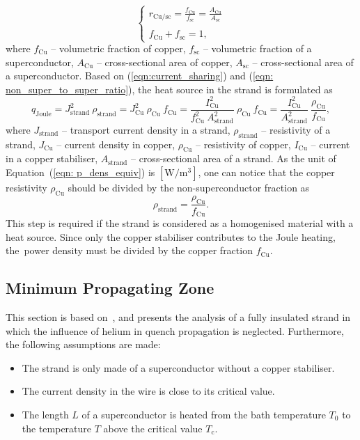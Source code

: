 \begin{equation}
    \left\{ \begin{array}{ll}
    r_\text{Cu/sc} = \frac{f_\text{Cu}}{f_\text{sc}} = \frac{A_\text{Cu}}{A_\text{sc}}\\ \\
    f_\text{Cu} + f_\text{sc} = 1,
    \end{array} \right.
    \label{eqn: non_super_to_super_ratio}
\end{equation}
where $f_\text{Cu}$ -- volumetric fraction of copper, $f_\text{sc}$ -- volumetric fraction of a superconductor, $A_\text{Cu}$ -- cross-sectional area of copper, $A_\text{sc}$ -- cross-sectional area of a superconductor. Based on (\ref{eqn:current_sharing}) and (\ref{eqn: non_super_to_super_ratio}), the heat source in the strand is formulated as 
\begin{equation}
    q_\text{Joule} = J_\text{strand}^2~\rho_\text{strand} = J_\text{Cu}^2~\rho_\text{Cu}~f_\text{Cu} = \frac{I_\text{Cu}^2}{f_\text{Cu}^2~A_\text{strand}^2}~\rho_\text{Cu}~f_\text{Cu} = \frac{I_\text{Cu}^2}{A_\text{strand}^2}~\frac{\rho_\text{Cu}}{f_\text{Cu}}, 
    \label{eqn: p_dens_equiv}
\end{equation}
where $J_\text{strand}$ -- transport current density in a strand, $\rho_\text{strand}$ -- resistivity of a strand, $J_\text{Cu}$ -- current density in copper, $\rho_\text{Cu}$ -- resistivity of copper, $I_\text{Cu}$ -- current in a copper stabiliser, $A_\text{strand}$ -- cross-sectional area of a strand. As the unit of Equation~(\ref{eqn: p_dens_equiv}) is $[\text{W}/\text{m}^3]$, one can notice that the copper resistivity $\rho_\text{Cu}$ should be divided by the non-superconductor fraction as 
\begin{equation}
    \rho_\text{strand} = \frac{\rho_\text{Cu}}{f_\text{Cu}}.
    \label{eqn:strand_resistivity}
\end{equation}
This step is required if the strand is considered as a homogenised material with a heat source. Since only the copper stabiliser contributes to the Joule heating, the~power density must be divided by the copper fraction $f_\text{Cu}$.

\subsection{Minimum Propagating Zone}

This section is based on~\cite[p.~124]{superconducting_accelerator_magnets}, and presents the analysis of a fully insulated strand in which the influence of helium in quench propagation is neglected. Furthermore, the following assumptions are made: 
\begin{itemize}
    \item The strand is only made of a superconductor without a copper stabiliser. 
    \item The current density in the wire is close to its critical value. 
    \item The length $L$ of a superconductor is heated from the bath temperature $T_0$ to the temperature $T$ above the critical value $T_\text{c}$.
\end{itemize}

